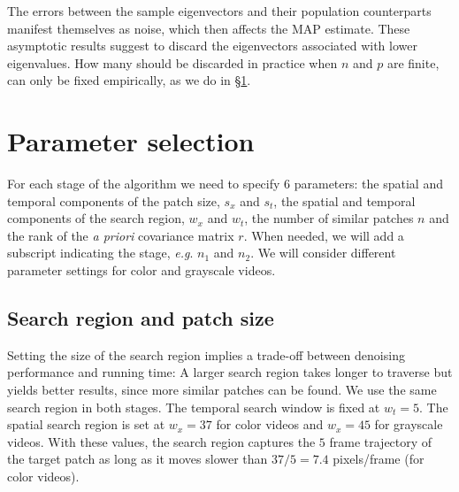 \documentclass[10pt, journal, twocolumn, final, a4paper]{IEEEtran}
\newcommand{\pcomment}[1]{}
\newcommand{\eg}{\emph{e.g}. } \newcommand{\Eg}{\emph{E.g}. }
\begin{document}
The errors between the sample eigenvectors and their population
counterparts manifest themselves as noise, which then affects the MAP estimate.
%
These asymptotic results suggest to discard the eigenvectors associated with 
lower eigenvalues. How many should be discarded in practice when $n$ and $p$ are finite, 
can only be fixed empirically, as we do in \S \ref{sec:parameters}.

\pcomment{Results of Bunea are still missing!}
\pcomment{More detailed explanation of the results?}

\section{Parameter selection}
\label{sec:parameters}

For each stage of the algorithm we need to specify 6 parameters: the spatial
and temporal components of the patch size, $s_x$ and $s_t$, the spatial and
temporal components of the search region, $w_x$ and $w_t$, the number of similar
patches $n$ and the rank of the \textit{a priori} covariance matrix $r$.
When needed, we will add a subscript indicating the stage, \eg
$n_{1}$ and $n_{2}$.
We will consider different parameter settings for color and grayscale videos.

\subsection{Search region and patch size}

Setting the size of the search region implies a trade-off between denoising
performance and running time: A larger search region takes longer to traverse
but yields better results, since more similar patches can be found. We use the same 
search region in both stages. The
temporal search window is fixed at $w_t = 5$. The spatial search region is set at
$w_x = 37$ for color videos and $w_x = 45$ for grayscale videos.
With these values, the search region captures the $5$ frame trajectory of the
target patch as long as it moves slower than $37/5 = 7.4$ pixels/frame (for
color videos).
\end{document}
